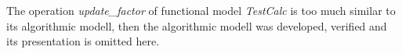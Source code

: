 
The operation \textit{update\_factor} of functional model \textit{TestCalc} is
too much similar to its algorithmic modell, then the algorithmic modell was
developed, verified and its presentation is omitted here.


% 
% 
% 
% 
% 
% 
% 
% 
% 
% 


